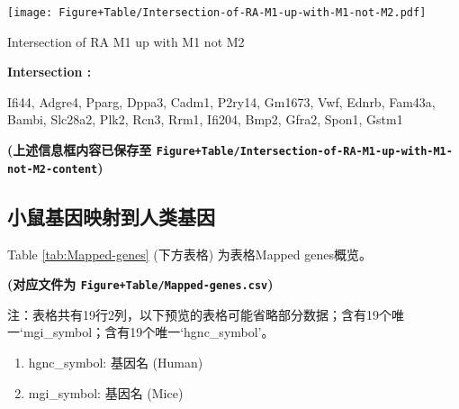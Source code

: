 \documentclass[
]{article}
\providecommand{\tightlist}{%
  \setlength{\itemsep}{0pt}\setlength{\parskip}{0pt}}
\begin{document}
\def\@captype{figure}
\begin{center}
\texttt{[image: Figure+Table/Intersection-of-RA-M1-up-with-M1-not-M2.pdf]}
\caption{Intersection of RA M1 up with M1 not M2}\label{fig:Intersection-of-RA-M1-up-with-M1-not-M2}
\end{center}
\begin{center}\begin{tcolorbox}[colback=gray!10, colframe=gray!50, width=0.9\linewidth, arc=1mm, boxrule=0.5pt]
\textbf{
Intersection
:}

\vspace{0.5em}

    Ifi44, Adgre4, Pparg, Dppa3, Cadm1, P2ry14, Gm1673,
Vwf, Ednrb, Fam43a, Bambi, Slc28a2, Plk2, Rcn3, Rrm1,
Ifi204, Bmp2, Gfra2, Spon1, Gstm1

\vspace{2em}
\end{tcolorbox}
\end{center}

\textbf{(上述信息框内容已保存至 \texttt{Figure+Table/Intersection-of-RA-M1-up-with-M1-not-M2-content})}

\hypertarget{ux5c0fux9f20ux57faux56e0ux6620ux5c04ux5230ux4ebaux7c7bux57faux56e0}{%
\subsection{小鼠基因映射到人类基因}\label{ux5c0fux9f20ux57faux56e0ux6620ux5c04ux5230ux4ebaux7c7bux57faux56e0}}

Table \ref{tab:Mapped-genes} (下方表格) 为表格Mapped genes概览。

\textbf{(对应文件为 \texttt{Figure+Table/Mapped-genes.csv})}

\begin{center}\begin{tcolorbox}[colback=gray!10, colframe=gray!50, width=0.9\linewidth, arc=1mm, boxrule=0.5pt]注：表格共有19行2列，以下预览的表格可能省略部分数据；含有19个唯一`mgi\_symbol；含有19个唯一`hgnc\_symbol'。
\end{tcolorbox}
\end{center}
\begin{center}\begin{tcolorbox}[colback=gray!10, colframe=gray!50, width=0.9\linewidth, arc=1mm, boxrule=0.5pt]\begin{enumerate}\tightlist
\item hgnc\_symbol:  基因名 (Human)
\item mgi\_symbol:  基因名 (Mice)
\end{enumerate}\end{tcolorbox}
\end{center}
\end{document}
